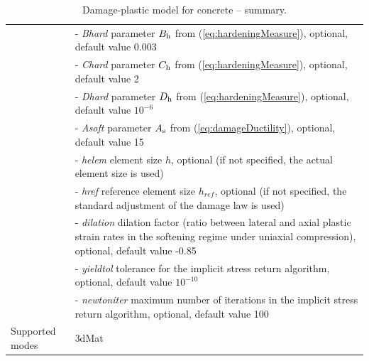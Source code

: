\documentclass[a4paper]{article}
\newcommand{\param}[1]{{\it #1}}
\begin{document}
\begin{table}[!htb]
\begin{tabular}{|l|p{9cm}|}
&- \param{Bhard} parameter $B_{\rm h}$ from (\ref{eq:hardeningMeasure}), optional, default value 0.003\\
&- \param{Chard} parameter $C_{\rm h}$ from (\ref{eq:hardeningMeasure}), optional, default value 2\\
&- \param{Dhard} parameter $D_{\rm h}$ from (\ref{eq:hardeningMeasure}), optional, default value $10^{-6}$\\
&- \param{Asoft} parameter $A_{\rm s}$ from (\ref{eq:damageDuctility}), optional, default value 15\\
&- \param{helem} element size $h$, optional (if not specified, the actual element size is used)\\
&- \param{href} reference element size $h_{ref}$, optional (if not specified, the standard adjustment of the damage law is used)\\
&- \param{dilation} dilation factor (ratio between lateral and axial plastic strain rates in the softening regime under uniaxial compression), optional, default value -0.85\\
&- \param{yieldtol} tolerance for the implicit stress return algorithm, optional, default value $10^{-10}$\\
&- \param{newtoniter} maximum number of iterations in the implicit stress return algorithm, optional, default value 100\\
Supported modes& 3dMat\\
\hline
\end{tabular}
\caption{Damage-plastic model for concrete -- summary.}
\label{dpm_table}
\end{table}
\end{document}
